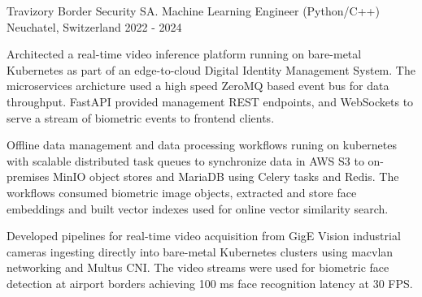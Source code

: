 

\begin{cventries}

\cventry
{Travizory Border Security SA.} %
{Machine Learning Engineer (Python/C++)} %
{Neuchatel, Switzerland} %
{2022 - 2024} %
{
  \begin{cvitems} %
    \item {
    Architected a real-time video inference platform running on 
    bare-metal Kubernetes as part of an edge-to-cloud Digital Identity Management 
    System. The microservices archicture used a high speed ZeroMQ based event bus for data 
    throughput. FastAPI provided management REST endpoints, and WebSockets to 
    serve a stream of biometric events to frontend clients.}
    \item {
    Offline data management and data processing workflows runing on kubernetes with 
    scalable distributed task queues to synchronize data in AWS S3 
    to on-premises MinIO object stores and MariaDB using Celery tasks and Redis. 
    The workflows consumed biometric image objects, extracted and store 
    face embeddings and built vector indexes used for online vector similarity search.}
    \item {
    Developed pipelines for real-time video acquisition from GigE Vision industrial cameras 
    ingesting directly into bare-metal Kubernetes clusters using macvlan networking and Multus CNI. 
    The video streams were used for biometric face detection at airport borders achieving 
    100 ms face recognition latency at 30 FPS.}
  \end{cvitems}
}


\end{cventries}
